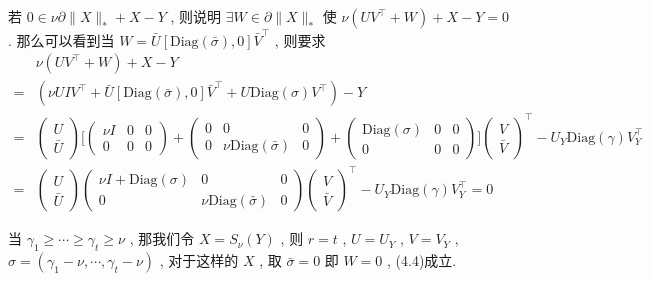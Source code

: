 \documentclass[UTF8]{ctexart}
\newcommand{\norm}[1]{\lVert#1\rVert}
\newcommand{\nunorm}{\norm{X}_*}
\numberwithin{equation}{section}
\begin{document}
		若 $0 \in \nu \partial \nunorm + X -Y$ , 则说明 $\exists W \in \partial \nunorm$ 使 $\nu (UV ^\top + W) + X -Y = 0$ . 那么可以看到当 $W = \bar{U}[\text{Diag}(\bar{\sigma}), 0]\bar{V} ^\top$ , 则要求
		\begin{equation}
			\begin{split}
					&\nu (UV ^\top + W) + X -Y\\
				=	&(\nu U I V ^\top + \bar{U}[\text{Diag}(\bar{\sigma}), 0]\bar{V} ^\top + U \text{Diag}(\sigma) V ^\top) - Y\\
				=	&\begin{pmatrix}
						U \\ \bar{U}
					\end{pmatrix}
					\Bigg [
						\begin{pmatrix}
							\nu I & 0 & 0\\
							0 & 0 & 0
						\end{pmatrix}
						+
						\begin{pmatrix}
							0 & 0 & 0\\
							0 & \nu \text{Diag}(\bar{\sigma}) & 0
						\end{pmatrix}
						+
						\begin{pmatrix}
							\text{Diag}(\sigma) & 0 & 0\\
							0 & 0 & 0
						\end{pmatrix}
						\Bigg ]
					\begin{pmatrix}
						V \\ \bar{V}
					\end{pmatrix} ^\top 
					- U_Y \text{Diag}(\gamma) V_Y ^\top\\
				=	&\begin{pmatrix}
						U \\ \bar{U}
					\end{pmatrix}
					\begin{pmatrix}
						\nu I + \text{Diag}(\sigma) & 0 & 0\\
						0 & \nu \text{Diag}(\bar{\sigma}) & 0
					\end{pmatrix}
					\begin{pmatrix}
						V \\ \bar{V}
					\end{pmatrix} ^\top 
					- U_Y \text{Diag}(\gamma) V_Y ^\top = 0
			\end{split}
		\end{equation}

		当 $\gamma_1 \ge \cdots \ge \gamma_t \ge \nu$ , 那我们令 $X = S_\nu(Y)$ , 则 $r = t$ , $U = U_Y$ , $V = V_Y$ , $\sigma = (\gamma_1 - \nu, \cdots, \gamma_t - \nu)$ , 对于这样的 $X$ , 取 $\bar{\sigma} = 0$ 即 $W = 0$ , (4.4)成立.
\end{document}
